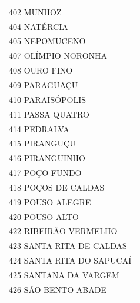 \documentclass{article}
\begin{document}
\begin{longtable}[c]{m{18cm}}
\multicolumn{1}{l}{ \hspace{2em} 402 MUNHOZ } \\
\multicolumn{1}{l}{ \hspace{2em} 404 NATÉRCIA } \\
\multicolumn{1}{l}{ \hspace{2em} 405 NEPOMUCENO } \\
\multicolumn{1}{l}{ \hspace{2em} 407 OLÍMPIO NORONHA } \\
\multicolumn{1}{l}{ \hspace{2em} 408 OURO FINO } \\
\multicolumn{1}{l}{ \hspace{2em} 409 PARAGUAÇU } \\
\multicolumn{1}{l}{ \hspace{2em} 410 PARAISÓPOLIS } \\
\multicolumn{1}{l}{ \hspace{2em} 411 PASSA QUATRO } \\
\multicolumn{1}{l}{ \hspace{2em} 414 PEDRALVA } \\
\multicolumn{1}{l}{ \hspace{2em} 415 PIRANGUÇU } \\
\multicolumn{1}{l}{ \hspace{2em} 416 PIRANGUINHO } \\
\multicolumn{1}{l}{ \hspace{2em} 417 POÇO FUNDO } \\
\multicolumn{1}{l}{ \hspace{2em} 418 POÇOS DE CALDAS } \\
\multicolumn{1}{l}{ \hspace{2em} 419 POUSO ALEGRE } \\
\multicolumn{1}{l}{ \hspace{2em} 420 POUSO ALTO } \\
\multicolumn{1}{l}{ \hspace{2em} 422 RIBEIRÃO VERMELHO } \\
\multicolumn{1}{l}{ \hspace{2em} 423 SANTA RITA DE CALDAS } \\
\multicolumn{1}{l}{ \hspace{2em} 424 SANTA RITA DO SAPUCAÍ } \\
\multicolumn{1}{l}{ \hspace{2em} 425 SANTANA DA VARGEM } \\
\multicolumn{1}{l}{ \hspace{2em} 426 SÃO BENTO ABADE } \\

\end{longtable}
\end{document}
